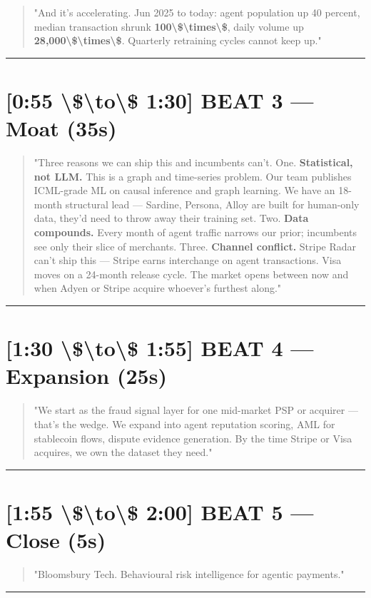 \documentclass[11pt]{article}
\begin{document}
\begin{quote}
"And it's accelerating. Jun 2025 to today: agent population up 40 percent, median transaction shrunk \textbf{100\textbackslash{}\$\textbackslash{}times\textbackslash{}\$}, daily volume up \textbf{28,000\textbackslash{}\$\textbackslash{}times\textbackslash{}\$}. Quarterly retraining cycles cannot keep up."
\end{quote}
\medskip\hrule\medskip
\section{[0:55 \textbackslash{}\$\textbackslash{}to\textbackslash{}\$ 1:30] BEAT 3 --- Moat (35s)}
\begin{quote}
"Three reasons we can ship this and incumbents can't.  One. \textbf{Statistical, not LLM.} This is a graph and time-series problem. Our team publishes ICML-grade ML on causal inference and graph learning. We have an 18-month structural lead --- Sardine, Persona, Alloy are built for human-only data, they'd need to throw away their training set.  Two. \textbf{Data compounds.} Every month of agent traffic narrows our prior; incumbents see only their slice of merchants.  Three. \textbf{Channel conflict.} Stripe Radar can't ship this --- Stripe earns interchange on agent transactions. Visa moves on a 24-month release cycle. The market opens between now and when Adyen or Stripe acquire whoever's furthest along."
\end{quote}
\medskip\hrule\medskip
\section{[1:30 \textbackslash{}\$\textbackslash{}to\textbackslash{}\$ 1:55] BEAT 4 --- Expansion (25s)}
\begin{quote}
"We start as the fraud signal layer for one mid-market PSP or acquirer --- that's the wedge. We expand into agent reputation scoring, AML for stablecoin flows, dispute evidence generation. By the time Stripe or Visa acquires, we own the dataset they need."
\end{quote}
\medskip\hrule\medskip
\section{[1:55 \textbackslash{}\$\textbackslash{}to\textbackslash{}\$ 2:00] BEAT 5 --- Close (5s)}
\begin{quote}
"Bloomsbury Tech. Behavioural risk intelligence for agentic payments."
\end{quote}
\medskip\hrule\medskip
\end{document}
